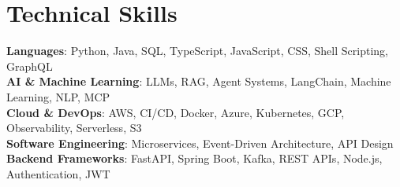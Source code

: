 \documentclass[letterpaper,11pt]{article}
\begin{document}
\section{Technical Skills}
 \begin{itemize}[leftmargin=0.15in, label={}]
    \small{\item{
     \textbf{Languages}{: Python, Java, SQL, TypeScript, JavaScript, CSS, Shell Scripting, GraphQL} \\
     \textbf{AI \& Machine Learning}{: LLMs, RAG, Agent Systems, LangChain, Machine Learning, NLP, MCP} \\
     \textbf{Cloud \& DevOps}{: AWS, CI/CD, Docker, Azure, Kubernetes, GCP, Observability, Serverless, S3} \\
     \textbf{Software Engineering}{: Microservices, Event-Driven Architecture, API Design} \\
     \textbf{Backend Frameworks}{: FastAPI, Spring Boot, Kafka, REST APIs, Node.js, Authentication, JWT} \\
    }}
 \end{itemize}
\end{document}
